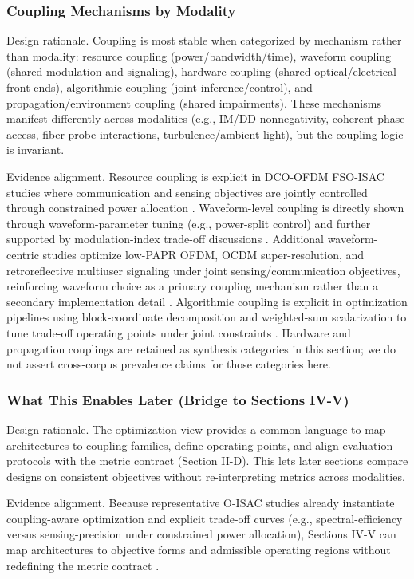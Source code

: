 \documentclass[letterpaper,journal]{IEEEtran}
\begin{document}
\subsubsection{Coupling Mechanisms by Modality}
Design rationale. Coupling is most stable when categorized by mechanism rather than modality: resource coupling (power/bandwidth/time), waveform coupling (shared modulation and signaling), hardware coupling (shared optical/electrical front-ends), algorithmic coupling (joint inference/control), and propagation/environment coupling (shared impairments). These mechanisms manifest differently across modalities (e.g., IM/DD nonnegativity, coherent phase access, fiber probe interactions, turbulence/ambient light), but the coupling logic is invariant.

Evidence alignment. Resource coupling is explicit in DCO-OFDM FSO-ISAC studies where communication and sensing objectives are jointly controlled through constrained power allocation \cite{O_ISAC_048,O_ISAC_023}.
Waveform-level coupling is directly shown through waveform-parameter tuning (e.g., power-split control) \cite{O_ISAC_075} and further supported by modulation-index trade-off discussions \cite{O_ISAC_001}. Additional waveform-centric studies optimize low-PAPR OFDM, OCDM super-resolution, and retroreflective multiuser signaling under joint sensing/communication objectives, reinforcing waveform choice as a primary coupling mechanism rather than a secondary implementation detail \cite{O_ISAC_219,O_ISAC_259,O_ISAC_272}.
Algorithmic coupling is explicit in optimization pipelines using block-coordinate decomposition and weighted-sum scalarization to tune trade-off operating points under joint constraints \cite{O_ISAC_023,O_ISAC_052}.
Hardware and propagation couplings are retained as synthesis categories in this section; we do not assert cross-corpus prevalence claims for those categories here.

\subsubsection{What This Enables Later (Bridge to Sections IV-V)}
Design rationale. The optimization view provides a common language to map architectures to coupling families, define operating points, and align evaluation protocols with the metric contract (Section II-D). This lets later sections compare designs on consistent objectives without re-interpreting metrics across modalities.

Evidence alignment. Because representative O-ISAC studies already instantiate coupling-aware optimization and explicit trade-off curves (e.g., spectral-efficiency versus sensing-precision under constrained power allocation), Sections IV-V can map architectures to objective forms and admissible operating regions without redefining the metric contract \cite{O_ISAC_048,O_ISAC_023,O_ISAC_052}.
\end{document}
